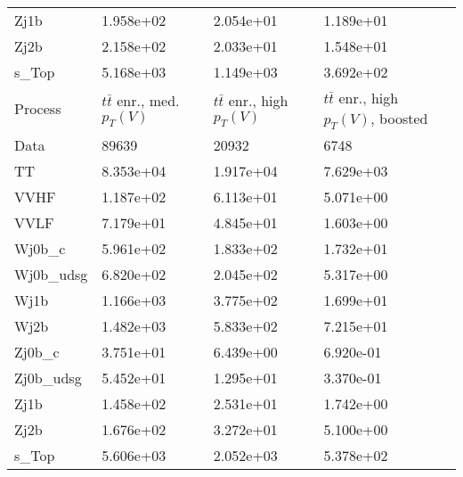 \begin{table}
{\begin{tabularx}{0.8\textwidth}{|X|X|X|X|}
Zj1b & 1.958e+02 & 2.054e+01 & 1.189e+01 \\
Zj2b & 2.158e+02 & 2.033e+01 & 1.548e+01 \\
s\_Top & 5.168e+03 & 1.149e+03 & 3.692e+02 \\
\hline
\hline
Process & $t\bar{t}$ enr., med. $p_{T}(V)$ & $t\bar{t}$ enr., high $p_{T}(V)$ & $t\bar{t}$ enr., high $p_{T}(V)$, boosted \\
\hline
Data & 89639 & 20932 & 6748 \\
\hline
TT & 8.353e+04 & 1.917e+04 & 7.629e+03 \\
VVHF & 1.187e+02 & 6.113e+01 & 5.071e+00 \\
VVLF & 7.179e+01 & 4.845e+01 & 1.603e+00 \\
Wj0b\_c & 5.961e+02 & 1.833e+02 & 1.732e+01 \\
Wj0b\_udsg & 6.820e+02 & 2.045e+02 & 5.317e+00 \\
Wj1b & 1.166e+03 & 3.775e+02 & 1.699e+01 \\
Wj2b & 1.482e+03 & 5.833e+02 & 7.215e+01 \\
Zj0b\_c & 3.751e+01 & 6.439e+00 & 6.920e-01 \\
Zj0b\_udsg & 5.452e+01 & 1.295e+01 & 3.370e-01 \\
Zj1b & 1.458e+02 & 2.531e+01 & 1.742e+00 \\
Zj2b & 1.676e+02 & 3.272e+01 & 5.100e+00 \\
s\_Top & 5.606e+03 & 2.052e+03 & 5.378e+02 \\
\hline
\end{tabularx}
}
\label{tab:cr-Wmn-2018}
\end{table}

